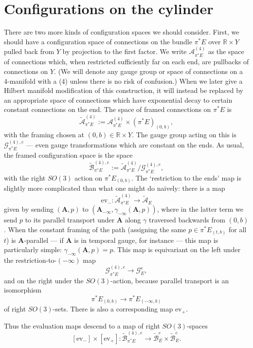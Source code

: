 \documentclass{memo-l}
\newcommand{\pE}{\pi^* \! E}
\theoremstyle{definition}
\theoremstyle{remark}
\numberwithin{section}{chapter}
\numberwithin{equation}{chapter}
\begin{document}
\section{Configurations on the cylinder}\label{sec:config-cyl}
There are two more kinds of configuration spaces we should consider. First, we should have a configuration space of connections on the bundle $\pE$ over $\mathbb R \times Y$ pulled back from $Y$ by projection to the first factor. We write $\mathcal A^{(4)}_{\pE}$ as the space of connections which, when restricted sufficiently far on each end, are pullbacks of connections on $Y$. (We will denote any gauge group or space of connections on a 4-manifold with a (4) unless there is no risk of confusion.) When we later give a Hilbert manifold modification of this construction, it will instead be replaced by an appropriate space of connections which have exponential decay to certain constant connections on the end. The space of framed connections on $\pE$ is $$\widetilde{\mathcal A}^{(4)}_{\pE} := \mathcal A^{(4)}_{\pE} \times (\pE)_{(0,b)},$$ with the framing chosen at $(0,b) \in \mathbb R \times Y$. The gauge group acting on this is $\mathcal G^{(4),e}_{\pE}$ --- even gauge transformations which are constant on the ends. As usual, the framed configuration space is the space $$\widetilde{\mathcal B}^{(4),e}_{\pE} := \widetilde{\mathcal A}^{(4)}_{\pE}/\mathcal G^{(4),e}_{\pE},$$ with the right $SO(3)$ action on $\pE_{(0,b)}$. The `restriction to the ends' map is slightly more complicated than what one might do naively: there is a map $$\text{ev}_-: \widetilde{\mathcal A}^{(4)}_{\pE} \to \widetilde{\mathcal A}_{E}$$ given by sending $(\mathbf{A}, p)$ to $(\mathbf{A}_{-\infty}, \gamma_{-\infty}(\mathbf{A}, p))$, where in the latter term we send $p$ to its parallel transport under $\mathbf{A}$ along $\gamma$ traversed backwards from $(0,b)$. When the constant framing of the path (assigning the same $p \in \pE_{(t,b)}$ for all $t$) is $\mathbf{A}$-parallel --- if $\mathbf{A}$ is in temporal gauge, for instance --- this map is particularly simple: $\gamma_{-\infty}(\mathbf{A}, p) = p$. This map is equivariant on the left under the restriction-to-$(-\infty)$ map $$\mathcal G^{(4),e}_{\pE} \to \mathcal G^e_E,$$ and on the right under the $SO(3)$-action, because parallel transport is an isomorphism $$\pE_{(0,b)} \to \pE_{(-\infty,b)}$$ of right $SO(3)$-sets. There is also a corresponding map $\text{ev}_+$.

Thus the evaluation maps descend to a map of right $SO(3)$-spaces $$[\text{ev}_-] \times [\text{ev}_+]: \widetilde{\mathcal B}^{(4),e}_{\pE} \to \widetilde{\mathcal B}^e_{E} \times \widetilde{\mathcal B}^e_{E}.$$
\end{document}
